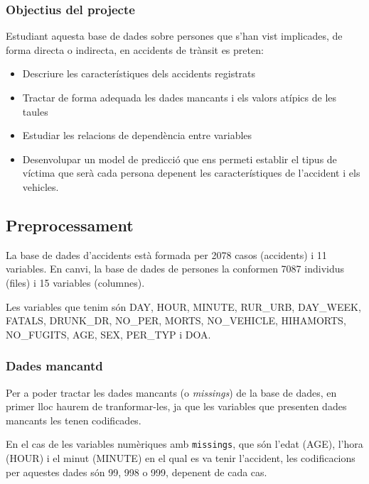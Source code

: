 \documentclass[12pt,longbibliography]{article}
\theoremstyle{definition}
\theoremstyle{remark}
\begin{document}
\subsubsection{Objectius del projecte}

Estudiant aquesta base de dades sobre persones que s'han vist implicades, de forma directa o indirecta, en accidents de trànsit es preten:

\begin{itemize}

\item Descriure les característiques dels accidents registrats

\item Tractar de forma adequada les dades mancants i els valors atípics de les taules

\item Estudiar les relacions de dependència entre variables

\item Desenvolupar un model de predicció que ens permeti establir el tipus de víctima que serà cada persona depenent les característiques de l'accident i els vehicles. 

\end{itemize}


\subsection{Preprocessament}

La base de dades d'accidents està formada per 2078 casos (accidents) i 11 variables. En canvi, la base de dades de persones la conformen 7087 individus (files) i 15 variables (columnes).


Les variables que tenim són DAY, HOUR, MINUTE, RUR\_URB, DAY\_WEEK, FATALS, DRUNK\_DR, NO\_PER, MORTS, NO\_VEHICLE, HIHAMORTS, NO\_FUGITS, AGE, SEX, PER\_TYP i DOA.

\subsubsection{Dades mancantd}

Per a poder tractar les dades mancants (o \textit{missings}) de la base de dades, en primer lloc haurem de tranformar-les, ja que les variables que presenten dades mancants les tenen codificades.

En el cas de les variables numèriques amb \texttt{missings}, que són l'edat (AGE), l'hora (HOUR) i el minut (MINUTE) en el qual es va tenir l'accident, les codificacions per aquestes dades són 99, 998 o 999, depenent de cada cas.
\end{document}
